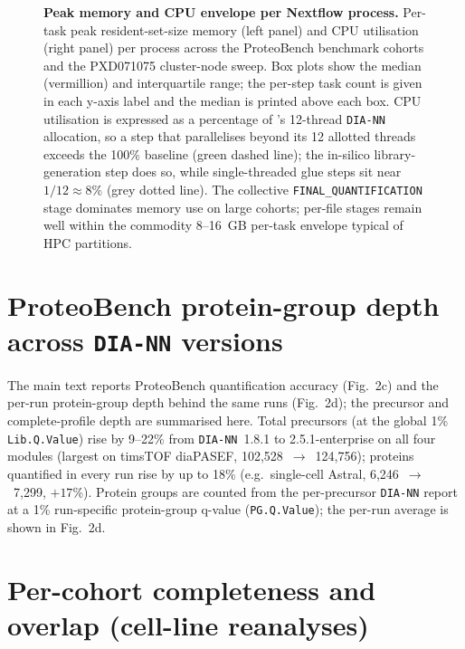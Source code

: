 \documentclass[preprint,12pt]{elsarticle}
\begin{document}
\begin{figure}[htbp]
  \centering
  \caption[Resources per task]{%
    \textbf{Peak memory and CPU envelope per Nextflow process.}
    Per-task peak resident-set-size memory (left panel) and CPU
    utilisation (right panel) per \quantmsdiann{} process across the
    ProteoBench benchmark cohorts and the PXD071075 cluster-node sweep.
    Box plots show the median (vermillion) and interquartile range; the
    per-step task count is given in each y-axis label and the median is
    printed above each box. CPU utilisation is expressed as a percentage
    of \quantmsdiann{}'s 12-thread \texttt{DIA-NN} allocation, so a step
    that parallelises beyond its 12 allotted threads exceeds the 100\%
    baseline (green dashed line); the in-silico library-generation step
    does so, while single-threaded glue steps sit near
    $1{/}12\approx8\%$ (grey dotted line). The collective
    \texttt{FINAL\_QUANTIFICATION} stage dominates memory use on large
    cohorts; per-file stages remain well within the commodity
    8--16~GB per-task envelope typical of HPC partitions.
  }
  \label{fig:resources-per-step}
\end{figure}

\section{ProteoBench protein-group depth across \texttt{DIA-NN} versions}
\label{sec:supp-proteobench-proteins}

The main text reports ProteoBench quantification accuracy (Fig.~2c) and the
per-run protein-group depth behind the same runs (Fig.~2d); the precursor and
complete-profile depth are summarised here. Total precursors (at the global 1\%
\texttt{Lib.Q.Value}) rise by 9--22\% from \texttt{DIA-NN}~1.8.1 to
2.5.1-enterprise on all four modules (largest on timsTOF diaPASEF,
102{,}528~$\to$~124{,}756); proteins quantified in every run rise by up to 18\%
(e.g.\ single-cell Astral, 6{,}246~$\to$~7{,}299, $+17$\%). Protein groups are
counted from the per-precursor \texttt{DIA-NN} report at a 1\% run-specific
protein-group q-value (\texttt{PG.Q.Value}); the per-run average is shown in
Fig.~2d.


\section{Per-cohort completeness and overlap (cell-line reanalyses)}
\label{sec:supp-reanalyses}
\end{document}
